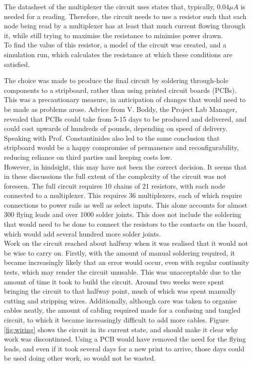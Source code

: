 The datasheet \cite{CD405xBC19:online} of the multiplexer the circuit uses states that, typically, $0.04\mu{}A$ is needed for a reading. Therefore, the circuit needs to use a resistor such that each node being read by a multiplexer has at least that much current flowing through it, while still trying to maximise the resistance to minimise power drawn.\\

To find the value of this resistor, a model of the circuit was created, and a simulation run, which calculates the resistance at which these conditions are satisfied. \\


The choice was made to produce the final circuit by soldering through-hole components to a stripboard, rather than using printed circuit boards (PCBs). This was a precautionary measure, in anticipation of changes that would need to be made as problems arose. Advice from V. Boddy, the Project Lab Manager, revealed that PCBs could take from 5-15 days to be produced and delivered, and could cost upwards of hundreds of pounds, depending on speed of delivery. Speaking with Prof. Constantinides also led to the same conclusion that stripboard would be a happy compromise of permanence and reconfigurability, reducing reliance on third parties and keeping costs low.\\

However, in hindsight, this may have not been the correct decision. It seems that in these discussions the full extent of the complexity of the circuit was not foreseen. The full circuit requires 10 chains of 21 resistors, with each node connected to a multiplexer. This requires 36 multiplexers, each of which require connections to power rails as well as select inputs. This alone accounts for almost 300 flying leads and over 1000 solder joints. This does not include the soldering that would need to be done to connect the resistors to the contacts on the board, which would add several hundred more solder joints. \\

Work on the circuit reached about halfway when it was realised that it would not be wise to carry on. Firstly, with the amount of manual soldering required, it became increasingly likely that an error would occur, even with regular continuity tests, which may render the circuit unusable. This was unacceptable due to the amount of time it took to build the circuit. Around two weeks were spent bringing the circuit to that halfway point, much of which was spent manually cutting and stripping wires. Additionally, although care was taken to organise cables neatly, the amount of cabling required made for a confusing and tangled circuit, to which it became increasingly difficult to add more cables. Figure \ref{fig:wiring} shows the circuit in its current state, and should make it clear why work was discontinued. Using a PCB would have removed the need for the flying leads, and even if it took several days for a new print to arrive, those days could be used doing other work, so would not be wasted.\\

